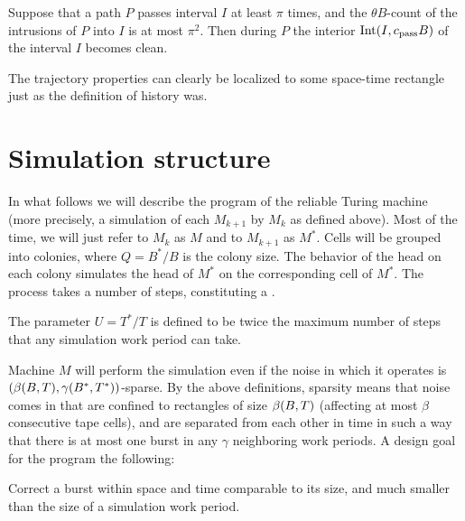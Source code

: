 \documentclass[11pt]{memoir}
\theoremstyle{definition} %
\def\B{B}
\def\U{U}
\newcommand{\Int}{\mathrm{Int}}
\newcommand{\passno}{\pi}
\newcommand{\Q}{Q}
\newcommand{\Tu}{T}
\newcommand{\Tus}{T^{*}}
\newcommand{\cns}[1]{c_{\textrm{\upshape #1}}}
\newcommand{\CPass}{\cns{pass}}
\begin{document}
\begin{definition}\label{def:pass-cleaning}
  Suppose that a path \( P \) passes interval \( I \) at least \( \pi \) times, and
  the \( \theta\B \)-count of the intrusions of \( P \) into \( I \) is at most \( \passno^{2} \).
 Then during \( P \) the interior \( \Int(I, \CPass\B) \) of the interval \( I \) becomes clean.
 \end{definition}

The trajectory properties can clearly be localized to some space-time
rectangle just as the definition of history was.


\section{Simulation structure}

In what follows we will describe the program of the reliable Turing machine
(more precisely, a simulation of each \( M_{k+1} \) by \( M_{k} \) as defined above).
Most of the time, we will just refer to \( M_{k} \) as \( M \) and to \( M_{k+1} \) as
\( M^{*} \).
Cells will be grouped into colonies, where  \( \Q=\B^{*}/\B \) is the colony size.
The behavior of the head on
each colony simulates the head of \( M^{*} \) on the corresponding cell
of \( M^{*} \).
The process takes a number of steps, constituting a .

\begin{definition}\label{def:Tu}
The parameter \( \U=\Tus/\Tu \) is defined to be
twice the maximum number of steps that any simulation work period can take.
\end{definition}

Machine \( M \) will perform the simulation even if the noise
in which it operates is \( (\beta\pair{\B}{\Tu}, \gamma\pair{\B^{*}}{\Tus}) \)-sparse.
By the above definitions, 
sparsity means that noise comes in  that are confined to
rectangles of size \( \beta\pair{\B}{\Tu} \) (affecting at most \( \beta \) consecutive tape cells), 
and are separated from each other in time in such a way that there is at most one burst
in any \( \gamma \) neighboring work periods.
A design goal for the program the following:

\begin{goal}\label{goal:locality}
Correct a burst within space and time comparable to its size, and much smaller than the 
size of a simulation work period.
\end{goal}
\end{document}
